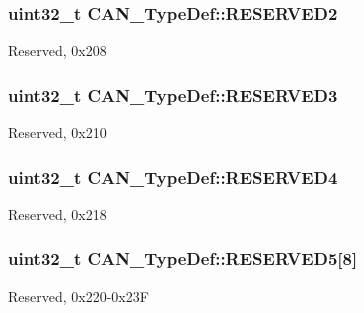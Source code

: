 \subsubsection[{\texorpdfstring{R\+E\+S\+E\+R\+V\+E\+D2}{RESERVED2}}]{\setlength{\rightskip}{0pt plus 5cm}uint32\+\_\+t C\+A\+N\+\_\+\+Type\+Def\+::\+R\+E\+S\+E\+R\+V\+E\+D2}\hypertarget{struct_c_a_n___type_def_ab29069c9fd10eeec47414abd8d06822f}{}\label{struct_c_a_n___type_def_ab29069c9fd10eeec47414abd8d06822f}
Reserved, 0x208 
\subsubsection[{\texorpdfstring{R\+E\+S\+E\+R\+V\+E\+D3}{RESERVED3}}]{\setlength{\rightskip}{0pt plus 5cm}uint32\+\_\+t C\+A\+N\+\_\+\+Type\+Def\+::\+R\+E\+S\+E\+R\+V\+E\+D3}\hypertarget{struct_c_a_n___type_def_af730af32307f845895465e8ead57d20c}{}\label{struct_c_a_n___type_def_af730af32307f845895465e8ead57d20c}
Reserved, 0x210 
\subsubsection[{\texorpdfstring{R\+E\+S\+E\+R\+V\+E\+D4}{RESERVED4}}]{\setlength{\rightskip}{0pt plus 5cm}uint32\+\_\+t C\+A\+N\+\_\+\+Type\+Def\+::\+R\+E\+S\+E\+R\+V\+E\+D4}\hypertarget{struct_c_a_n___type_def_a51c408c7c352b8080f0c6d42bf811d43}{}\label{struct_c_a_n___type_def_a51c408c7c352b8080f0c6d42bf811d43}
Reserved, 0x218 
\subsubsection[{\texorpdfstring{R\+E\+S\+E\+R\+V\+E\+D5}{RESERVED5}}]{\setlength{\rightskip}{0pt plus 5cm}uint32\+\_\+t C\+A\+N\+\_\+\+Type\+Def\+::\+R\+E\+S\+E\+R\+V\+E\+D5\mbox{[}8\mbox{]}}\hypertarget{struct_c_a_n___type_def_ad4339975b6064cfe2aaeb642f916d6e0}{}\label{struct_c_a_n___type_def_ad4339975b6064cfe2aaeb642f916d6e0}
Reserved, 0x220-\/0x23F 
